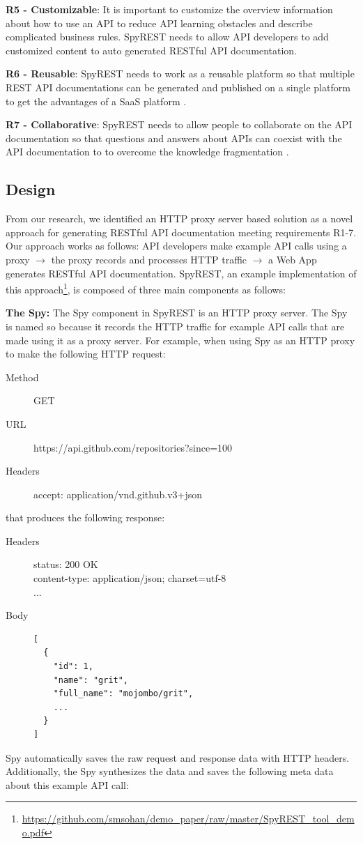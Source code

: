 \documentclass[conference]{IEEEtran}
\begin{document}
  \textbf{R5 - Customizable}: It is important to customize the overview information about how to use an API to reduce API learning obstacles and describe complicated business rules\cite{Robillard_what_makes}. SpyREST needs to allow API developers to add customized content to auto generated RESTful API documentation.

  \textbf{R6 - Reusable}: SpyREST needs to work as a reusable platform so that multiple REST API documentations can be generated and published on a single platform to get the advantages of a SaaS platform \cite{Stepalina_saas}.

  \textbf{R7 - Collaborative}: SpyREST needs to allow people to collaborate on the API documentation so that questions and answers about APIs can coexist with the API documentation to to overcome the knowledge fragmentation \cite{Chen_who_asked}.


\subsection{Design} %
From our research, we identified an HTTP proxy server based solution as a novel approach for generating RESTful API documentation meeting requirements R1-7. Our approach works as follows: API developers make example API calls using a proxy $\longrightarrow$ the proxy records and processes HTTP traffic $\longrightarrow$ a Web App generates RESTful API documentation. SpyREST, an example implementation of this approach\footnote{\url{https://github.com/smsohan/demo_paper/raw/master/SpyREST_tool_demo.pdf}}, is composed of three main components as follows:

\textbf{The Spy:} The Spy component in SpyREST is an HTTP proxy server. The Spy is named so because it records the HTTP traffic for example API calls that are made using it as a proxy server. For example, when using Spy as an HTTP proxy to make the following HTTP request:

\footnotesize
\begin{description}
  \item[Method] GET
  \item[URL] https://api.github.com/repositories?since=100
  \item[Headers] accept: application/vnd.github.v3+json
\end{description}
\normalsize
that produces the following response:
\footnotesize
\begin{description}
  \item[Headers] status: 200 OK \\
content-type: application/json; charset=utf-8 \\
...
  \item[Body]
\begin{lstlisting}
[
  {
    "id": 1,
    "name": "grit",
    "full_name": "mojombo/grit",
    ...
  }
]\end{lstlisting}
\end{description}
\normalsize
Spy automatically saves the raw request and response data with HTTP headers. Additionally, the Spy synthesizes the data and saves the following meta data about this example API call:
\end{document}
